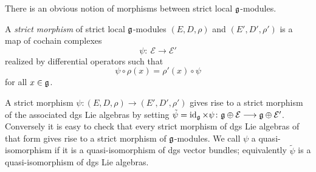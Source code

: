 \documentclass[pdftex]{sigma}
\numberwithin{equation}{section}
\def\cE{\mathcal E}\def\cF{\mathcal F}\def\cG{\mathcal G}\def\cH{\mathcal H}
\DeclareMathOperator{\id}{id}
\begin{document}
There is an obvious notion of morphisms between strict local $\mathfrak g$-modules.
\begin{dfn}
	A \emph{strict morphism} of strict local $\mathfrak g$-modules	$(E,D,\rho)$ and $(E',D',\rho')$ is a map of cochain complexes
	\begin{equation*}
	\psi \colon \ \cE \longrightarrow \cE'
	\end{equation*}
	realized by differential operators such that
	\begin{equation*}
	\psi \circ \rho(x) = \rho'(x) \circ \psi
	\end{equation*}
	for all $x \in \mathfrak g$.
\end{dfn}
A strict morphism $\psi \colon (E,D,\rho) \longrightarrow (E',D',\rho')$ gives rise to a strict morphism of the associated dgs Lie algebras by setting $\tilde{\psi} = \id_{\fg} \times \psi \colon \fg \oplus \cE \longrightarrow \fg \oplus \cE'$. Conversely it is easy to check that every strict morphism of dgs Lie algebras of that form gives rise to a strict morphism of $\mathfrak g$-modules. We call $\psi$ a quasi-isomorphism if it is a quasi-isomorphism of dgs vector bundles; equivalently $\tilde{\psi}$ is a quasi-isomorphism of dgs Lie algebras.
\end{document}
